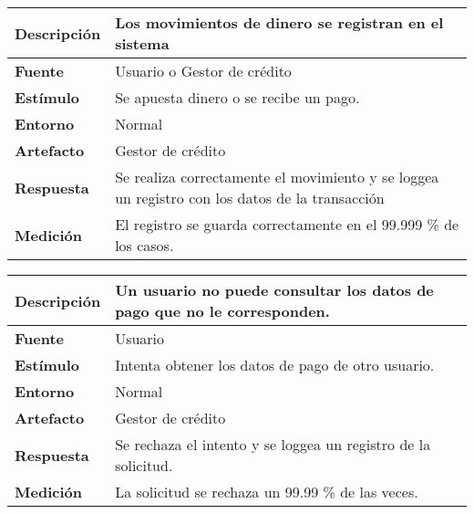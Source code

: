\begin{center}
  \begin{tabular}{| l | p{10cm} | }
    \hline
	\textbf{Descripción} & Los movimientos de dinero se registran en el sistema\\  \hline
	\textbf{Fuente} & Usuario o Gestor de crédito\\  \hline
	\textbf{Estímulo} & Se apuesta dinero o se recibe un pago.\\  \hline
	\textbf{Entorno} & Normal\\  \hline
	\textbf{Artefacto} & Gestor de crédito\\  \hline
	\textbf{Respuesta} & Se realiza correctamente el movimiento y se loggea un registro con los datos de la transacción\\  \hline
	\textbf{Medición} & El registro se guarda correctamente en el 99.999 \% de los casos.\\  \hline
  \end{tabular}
\end{center}  

\begin{center}
  \begin{tabular}{| l | p{10cm} | }
    \hline
	\textbf{Descripción} & Un usuario no puede consultar los datos de pago que no le corresponden.\\  \hline
	\textbf{Fuente} & Usuario\\  \hline
	\textbf{Estímulo} & Intenta obtener los datos de pago de otro usuario.\\  \hline
	\textbf{Entorno} & Normal\\  \hline
	\textbf{Artefacto} & Gestor de crédito\\  \hline
	\textbf{Respuesta} & Se rechaza el intento y se loggea un registro de la solicitud.\\  \hline
	\textbf{Medición} & La solicitud se rechaza un 99.99 \% de las veces.\\  \hline
  \end{tabular}
\end{center}


